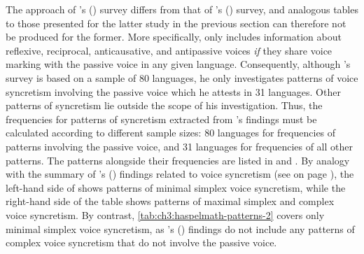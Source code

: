 The approach of \citeauthor{haspelmath:1990}’s (\citeyear{haspelmath:1990}) survey differs from that of \citeauthor{geniusiene:1987}’s (\citeyear{geniusiene:1987}) survey, and analogous tables to those presented for the latter study in the previous section can therefore not be produced for the former. More specifically, \citet{haspelmath:1990} only includes information about reflexive, reciprocal, anticausative, and antipassive voices \textit{if} they share voice marking with the passive voice in any given language. Consequently, although \citeauthor{haspelmath:1990}’s survey is based on a sample of 80 languages, he only investigates patterns of voice syncretism involving the passive voice which he attests in 31 languages. Other patterns of syncretism lie outside the scope of his investigation. Thus, the frequencies for patterns of syncretism extracted from \citeauthor{haspelmath:1990}’s findings must be calculated according to different sample sizes: 80 languages for frequencies of patterns involving the passive voice, and 31 languages for frequencies of all other patterns. The patterns alongside their frequencies are listed in  and . By analogy with the summary of \citeauthor{geniusiene:1987}’s (\citeyear{geniusiene:1987}) findings related to voice syncretism (see  on page \pageref{tab:ch3:geniusiene-patterns}), the left-hand side of  shows patterns of minimal simplex voice syncretism, while the right-hand side of the table shows patterns of maximal simplex and complex voice syncretism. By contrast, \ref{tab:ch3:haspelmath-patterns-2} covers only minimal simplex voice syncretism, as \citeauthor{haspelmath:1990}’s (\citeyear{haspelmath:1990}) findings do not include any patterns of complex voice syncretism that do not involve the passive voice.

